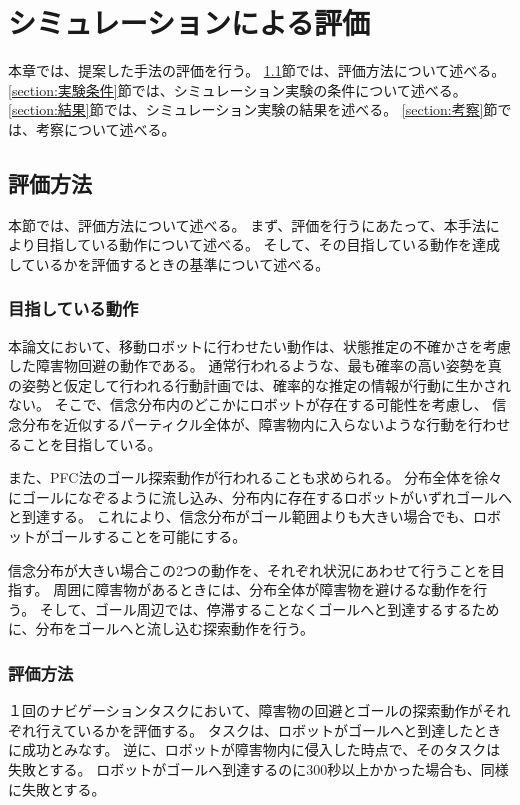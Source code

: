\chapter{シミュレーションによる評価} \label{chapter:evaluate}
本章では、提案した手法の評価を行う。
\ref{section:評価方法}節では、評価方法について述べる。
\ref{section:実験条件}節では、シミュレーション実験の条件について述べる。
\ref{section:結果}節では、シミュレーション実験の結果を述べる。
\ref{section:考察}節では、考察について述べる。

\section{評価方法} \label{section:評価方法}
本節では、評価方法について述べる。
まず、評価を行うにあたって、本手法により目指している動作について述べる。
そして、その目指している動作を達成しているかを評価するときの基準について述べる。

\subsection{目指している動作}
本論文において、移動ロボットに行わせたい動作は、状態推定の不確かさを考慮した障害物回避の動作である。
通常行われるような、最も確率の高い姿勢を真の姿勢と仮定して行われる行動計画では、確率的な推定の情報が行動に生かされない。
そこで、信念分布内のどこかにロボットが存在する可能性を考慮し、
信念分布を近似するパーティクル全体が、障害物内に入らないような行動を行わせることを目指している。

また、PFC法のゴール探索動作が行われることも求められる。
分布全体を徐々にゴールになぞるように流し込み、分布内に存在するロボットがいずれゴールへと到達する。
これにより、信念分布がゴール範囲よりも大きい場合でも、ロボットがゴールすることを可能にする。

信念分布が大きい場合この2つの動作を、それぞれ状況にあわせて行うことを目指す。
周囲に障害物があるときには、分布全体が障害物を避けるな動作を行う。
そして、ゴール周辺では、停滞することなくゴールへと到達するするために、分布をゴールへと流し込む探索動作を行う。

\subsection{評価方法}
１回のナビゲーションタスクにおいて、障害物の回避とゴールの探索動作がそれぞれ行えているかを評価する。
タスクは、ロボットがゴールへと到達したときに成功とみなす。
逆に、ロボットが障害物内に侵入した時点で、そのタスクは失敗とする。
ロボットがゴールへ到達するのに300秒以上かかった場合も、同様に失敗とする。

